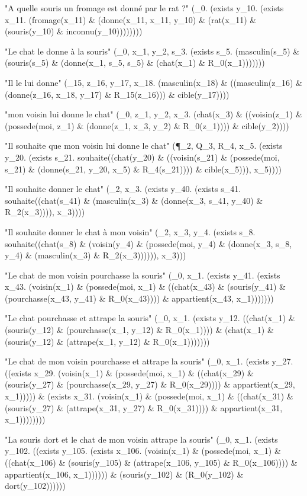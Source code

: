 \documentclass[12pt]{article}
\theoremstyle{exostyle}
\begin{document}
\begin{spverbatim}
"A quelle souris un fromage est donné par le rat ?"
 (\x_0. (exists y_10. (exists x_11. (fromage(x_11) & (donne(x_11, x_11, y_10) & (rat(x_11) & (souris(y_10) & inconnu(y_10))))))))

"Le chat le donne à la souris"
 (\R_0, x_1, y_2, s_3. (exists s_5. (masculin(s_5) & (souris(s_5) & (donne(x_1, s_5, s_5) & (chat(x_1) & R_0(x_1)))))))

"Il le lui donne"
 (\R_15, z_16, y_17, x_18. (masculin(x_18) & ((masculin(z_16) & (donne(z_16, x_18, y_17) & R_15(z_16))) & cible(y_17))))

"mon voisin lui donne le chat"
 (\R_0, z_1, y_2, x_3. (chat(x_3) & ((voisin(z_1) & (possede(moi, z_1) & (donne(z_1, x_3, y_2) & R_0(z_1)))) & cible(y_2))))

"Il souhaite que mon voisin lui donne le chat"
 (\P_2, Q_3, R_4, x_5. (exists y_20. (exists s_21. souhaite((chat(y_20) & ((voisin(s_21) & (possede(moi, s_21) & (donne(s_21, y_20, x_5) & R_4(s_21)))) & cible(x_5))), x_5))))

"Il souhaite donner le chat"
 (\R_2, x_3. (exists y_40. (exists s_41. souhaite((chat(s_41) & (masculin(x_3) & (donne(x_3, s_41, y_40) & R_2(x_3)))), x_3))))

"Il souhaite donner le chat à mon voisin"
 (\R_2, x_3, y_4. (exists s_8. souhaite((chat(s_8) & (voisin(y_4) & (possede(moi, y_4) & (donne(x_3, s_8, y_4) & (masculin(x_3) & R_2(x_3)))))), x_3)))

"Le chat de mon voisin pourchasse la souris"
 (\R_0, x_1. (exists y_41. (exists x_43. (voisin(x_1) & (possede(moi, x_1) & ((chat(x_43) & (souris(y_41) & (pourchasse(x_43, y_41) & R_0(x_43)))) & appartient(x_43, x_1)))))))

"Le chat pourchasse et attrape la souris"
 (\R_0, x_1. (exists y_12. ((chat(x_1) & (souris(y_12) & (pourchasse(x_1, y_12) & R_0(x_1)))) & (chat(x_1) & (souris(y_12) & (attrape(x_1, y_12) & R_0(x_1)))))))

"Le chat de mon voisin pourchasse et attrape la souris"
 (\R_0, x_1. (exists y_27. ((exists x_29. (voisin(x_1) & (possede(moi, x_1) & ((chat(x_29) & (souris(y_27) & (pourchasse(x_29, y_27) & R_0(x_29)))) & appartient(x_29, x_1))))) & (exists x_31. (voisin(x_1) & (possede(moi, x_1) & ((chat(x_31) & (souris(y_27) & (attrape(x_31, y_27) & R_0(x_31)))) & appartient(x_31, x_1))))))))

"La souris dort et le chat de mon voisin attrape la souris"
 (\R_0, x_1. (exists y_102. ((exists y_105. (exists x_106. (voisin(x_1) & (possede(moi, x_1) & ((chat(x_106) & (souris(y_105) & (attrape(x_106, y_105) & R_0(x_106)))) & appartient(x_106, x_1)))))) & (souris(y_102) & (R_0(y_102) & dort(y_102))))))


\end{spverbatim}
\end{document}
